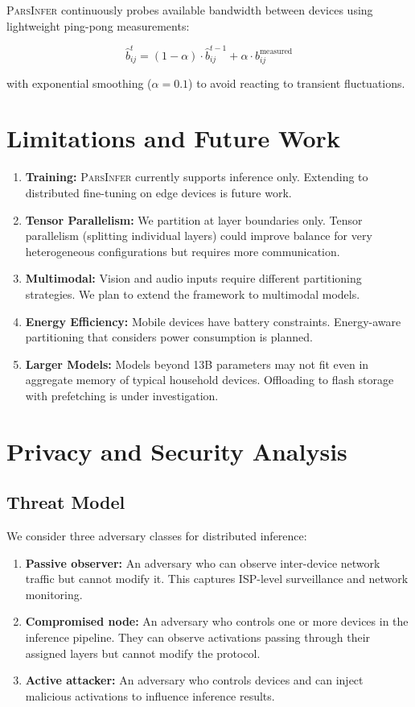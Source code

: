 \documentclass[11pt,a4paper]{article}
\newcommand{\parsdi}{\textsc{ParsInfer}\xspace}
\begin{document}
\parsdi continuously probes available bandwidth between devices using lightweight ping-pong measurements:

\begin{equation}
    \hat{b}_{ij}^t = (1 - \alpha) \cdot \hat{b}_{ij}^{t-1} + \alpha \cdot b_{ij}^{\text{measured}}
\end{equation}

with exponential smoothing ($\alpha = 0.1$) to avoid reacting to transient fluctuations.

\section{Limitations and Future Work}

\begin{enumerate}
    \item \textbf{Training:} \parsdi currently supports inference only. Extending to distributed fine-tuning on edge devices is future work.
    \item \textbf{Tensor Parallelism:} We partition at layer boundaries only. Tensor parallelism (splitting individual layers) could improve balance for very heterogeneous configurations but requires more communication.
    \item \textbf{Multimodal:} Vision and audio inputs require different partitioning strategies. We plan to extend the framework to multimodal models.
    \item \textbf{Energy Efficiency:} Mobile devices have battery constraints. Energy-aware partitioning that considers power consumption is planned.
    \item \textbf{Larger Models:} Models beyond 13B parameters may not fit even in aggregate memory of typical household devices. Offloading to flash storage with prefetching is under investigation.
\end{enumerate}

\section{Privacy and Security Analysis}

\subsection{Threat Model}

We consider three adversary classes for distributed inference:

\begin{enumerate}
    \item \textbf{Passive observer:} An adversary who can observe inter-device network traffic but cannot modify it. This captures ISP-level surveillance and network monitoring.
    \item \textbf{Compromised node:} An adversary who controls one or more devices in the inference pipeline. They can observe activations passing through their assigned layers but cannot modify the protocol.
    \item \textbf{Active attacker:} An adversary who controls devices and can inject malicious activations to influence inference results.
\end{enumerate}
\end{document}
